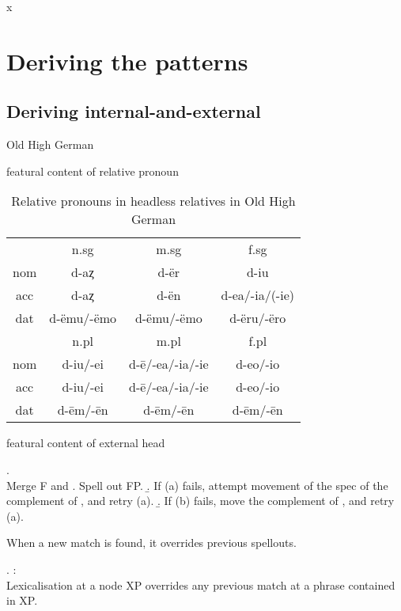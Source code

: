 x

\section{Deriving the patterns}

\subsection{Deriving internal-and-external}

Old High German

featural content of relative pronoun

\begin{table}[H]\label{tbl:paradigmohg}
 \center
 \caption {Relative pronouns in headless relatives in Old High German}
  \begin{tabular}{cccc}
  \toprule
       & \ac{n}.\ac{sg} & \ac{m}.\ac{sg}  & \ac{f}.\ac{sg} \\
        \cmidrule{2-4}
  \ac{nom} & d-aȥ           & d-ër          & d-iu      \\
  \ac{acc} & d-aȥ        & d-ën      & d-ea/-ia/(-ie) \\
  \ac{dat} & d-ëmu/-ëmo     & d-ëmu/-ëmo   & d-ëru/-ëro   \\
  \bottomrule
         & \ac{n}.\ac{pl} & \ac{m}.\ac{pl}   & \ac{f}.\ac{pl} \\
          \cmidrule{2-4}
    \ac{nom}  & d-iu/-ei      &  d-ē/-ea/-ia/-ie & d-eo/-io        \\
    \ac{acc}  & d-iu/-ei      &  d-ē/-ea/-ia/-ie & d-eo/-io        \\
    \ac{dat}  & d-ēm/-ēn      &  d-ēm/-ēn        & d-ēm/-ēn        \\
    \bottomrule
  \end{tabular}
\end{table}

featural content of external head

\ex. \\
Merge F and \label{ex:spellout}
 \a. Spell out FP.
 \b. If (a) fails, attempt movement of the spec of the complement of , and retry (a).
 \b. If (b) fails, move the complement of , and retry (a).

When a new match is found, it overrides previous spellouts.

\ex.  \citep{starke2018}:\\
Lexicalisation at a node XP overrides any previous match at a phrase contained in XP.

